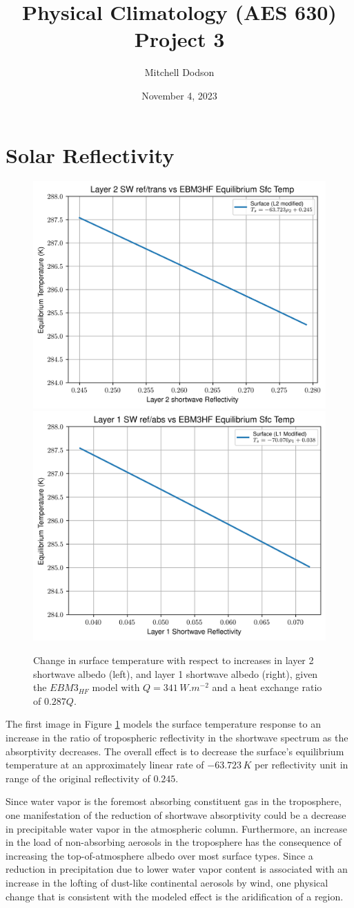 \documentclass[12pt]{article}
\title{Physical Climatology (AES 630) Project 3}
\author{Mitchell Dodson}
\date{November 4, 2023}
\begin{document}
\vspace{-2em}

\maketitle

\vspace{-2em}

\section{Solar Reflectivity}

\begin{figure}[h!]\label{p1}
    \centering
    \includegraphics[width=.48\linewidth]{p1a.png}
    \includegraphics[width=.48\linewidth]{p1b.png}
    \caption{Change in surface temperature with respect to increases in layer 2 shortwave albedo (left), and layer 1 shortwave albedo (right), given the $EBM3_{HF}$ model with $Q=341\,\si{W.m^{-2}}$ and a heat exchange ratio of $0.287Q$.}
\end{figure}

The first image in Figure \ref{p1} models the surface temperature response to an increase in the ratio of tropospheric reflectivity in the shortwave spectrum as the absorptivity decreases. The overall effect is to decrease the surface's equilibrium temperature at an approximately linear rate of $-63.723\,\si{K}$ per reflectivity unit in range of the original reflectivity of $0.245$.

Since water vapor is the foremost absorbing constituent gas in the troposphere, one manifestation of the reduction of shortwave absorptivity could be a decrease in precipitable water vapor in the atmospheric column. Furthermore, an increase in the load of non-absorbing aerosols in the troposphere has the consequence of increasing the top-of-atmosphere albedo over most surface types. Since a reduction in precipitation due to lower water vapor content is associated with an increase in the lofting of dust-like continental aerosols by wind, one physical change that is consistent with the modeled effect is the aridification of a region.
\end{document}
